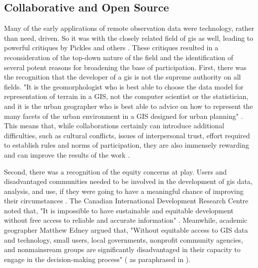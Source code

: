 \documentclass[notitlepage]{article}
\begin{document}
\subsection{Collaborative and Open Source} \label{sec:collaborative}

Many of the early applications of remote observation data were technology, rather than need, driven. So it was with the closely related field of \ac{gis} as well, leading to powerful critiques by Pickles and others \cite{picklesGroundTruthSocial1994}. These critiques resulted in a reconsideration of the top-down nature of the field and the identification of several potent reasons for broadening the base of participation. First, there was the recognition that the developer of a \ac{gis} is not the supreme authority on all fields. "It is the geomorphologist who is best able to choose the data model for representation of terrain in a GIS, not the computer scientist or the statistician, and it is the urban geographer who is best able to advice on how to represent the many facets of the urban environment in a GIS designed for urban planning" \cite{goodchildGeographicInformationSystems1994}. This means that, while collaborations certainly can introduce additional difficulties, such as cultural conflicts, issues of interpersonal trust, effort required to establish rules and norms of participation, they are also immensely rewarding and can improve the results of the work \cite{tullochInstitutionalGeographicInformation2007}. 

%

Second, there was a recognition of the equity concerns at play. Users and disadvantaged communities needed to be involved in the development of \ac{gis} data, analysis, and use, if they were going to have a meaningful chance of improving their circumstances \cite{talenBottomUpGIS2000}. The Canadian International Development Research Centre noted that, "It is impossible to have sustainable and equitable development without free access to reliable and accurate information" \cite{benmouffokInformationDecisionMaking1993}. Meanwhile, academic geographer Matthew Edney argued that, "Without equitable access to GIS data and technology, small users, local governments, nonprofit community agencies, and nonmainsream groups are significantly disadvantaged in their capacity to engage in the decision-making process" (\cite{edney1991strategies} as paraphrased in \cite{harrisPursuingSocialGoals1994}). 
\end{document}
